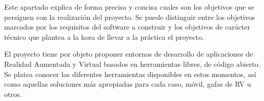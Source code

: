 
Este apartado explica de forma precisa y concisa cuales son los objetivos que se persiguen con la realización del proyecto. Se puede distinguir entre los objetivos marcados por los requisitos del software a construir y los objetivos de carácter técnico que plantea a la hora de llevar a la práctica el proyecto.

El proyecto tiene por objeto proponer entornos de desarrollo de aplicaciones de Realidad Aumentada y Virtual basados en herramientas libres, de código abierto. Se platea conocer las diferentes herramientas disponibles en estos momentos, así como aquellas soluciones más apropiadas para cada caso, móvil, gafas de RV u otros.